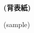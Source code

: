 \begin{titlepage}
\centering
\vspace*{5cm}

{\Huge\bfseries (背表紙)}

\vspace{2cm}

{\Large (sample)}

\vfill

\end{titlepage}